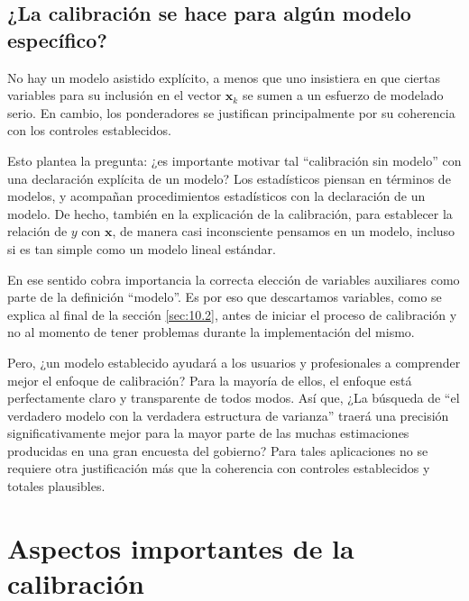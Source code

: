 \documentclass[a4paper,twoside,openright,12pt]{book}
\theoremstyle{definition}
\numberwithin{equation}{chapter}
\numberwithin{figure}{chapter}
\numberwithin{table}{chapter}
\numberwithin{theorem}{chapter}
\numberwithin{lemma}{chapter}
\begin{document}
\section{¿La calibración se hace para algún modelo específico?}
No hay un modelo asistido explícito, a menos que uno insistiera en que ciertas variables para su inclusión en el vector $\mathbf{x}_k$ se sumen a un esfuerzo de modelado serio. En cambio, los ponderadores se justifican principalmente por su coherencia con los controles establecidos.

Esto plantea la pregunta: ¿es importante motivar tal ``calibración sin modelo'' con una declaración explícita de un modelo? Los estadísticos piensan en términos de modelos, y acompañan procedimientos estadísticos con la declaración de un modelo. De hecho, también en la explicación de la calibración, para establecer la relación de $y$ con $\mathbf x$, de manera casi inconsciente pensamos en un modelo, incluso si es tan simple como un modelo lineal estándar.

En ese sentido cobra importancia la correcta elección de variables auxiliares como parte de la definición ``modelo''. Es por eso que descartamos variables, como se explica al final de la sección \ref{sec:10.2}, antes de iniciar el proceso de calibración y no al momento de tener problemas durante la implementación del mismo.

Pero, ¿un modelo establecido ayudará a los usuarios y profesionales a comprender mejor el enfoque de calibración? Para la mayoría de ellos, el enfoque está perfectamente claro y transparente de todos modos. Así que, ¿La búsqueda de ``el verdadero modelo con la verdadera estructura de varianza'' traerá una precisión significativamente mejor para la mayor parte de las muchas estimaciones producidas en una gran encuesta del gobierno? Para tales aplicaciones no se requiere otra justificación más que la coherencia con controles establecidos y totales plausibles.

\chapter{Aspectos importantes de la calibración}
\end{document}
